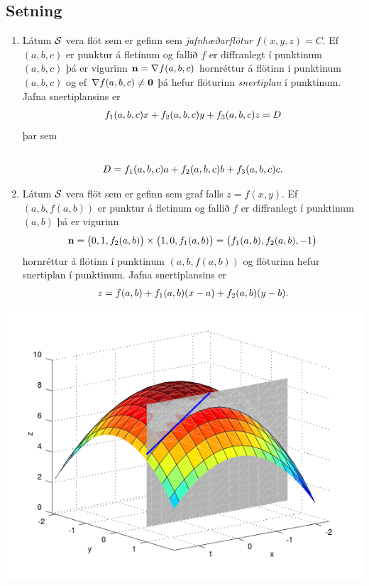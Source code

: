 \documentclass[a4paper,10pt,icelandic]{sphinxmanual}
\begin{document}
\subsection{Setning}
\label{Kafli5:id17}\begin{enumerate}
\item {} 
Látum \(\cal S\) vera flöt sem er gefinn sem \textit{jafnhæðarflötur}
\(f(x,y,z)=C\). Ef \((a, b, c)\) er punktur á fletinum og
fallið \(f\) er diffranlegt í punktinum \((a, b,c)\) þá er
vigurinn \(\mbox{${\bf n}$}=\nabla f(a, b, c)\) hornréttur á
flötinn í punktinum \((a,b, c)\) og ef
\(\nabla f(a, b, c)\neq \mbox{${\bf 0}$}\) þá hefur flöturinn
\textit{snertiplan} í punktinum. Jafna snertiplansins er
\begin{gather}
\begin{split}\displaystyle f_1(a, b, c)x+f_2(a, b, c)y+f_3(a, b, c)z=D\end{split}\notag
\end{gather}
þar sem
\begin{gather}
\begin{split}\displaystyle\end{split}\notag\\\begin{split}D= f_1(a, b, c)a+f_2(a, b, c)b
+f_3(a, b, c)c.\end{split}\notag
\end{gather}
\item {} 
Látum \(\cal S\) vera flöt sem er gefinn sem graf falls
\(z=f(x,y)\). Ef \((a, b, f(a,b))\) er punktur á fletinum og
fallið \(f\) er diffranlegt í punktinum \((a, b)\) þá er
vigurinn
\begin{gather}
\begin{split}\displaystyle \mbox{${\bf n}$}=\big(0 ,1 ,f_2(a, b)\big)\times\big(1 ,0 ,f_1(a, b)\big)=\big(f_1(a, b), f_2(a, b), -1\big)\end{split}\notag
\end{gather}
hornréttur á flötinn í punktinum \((a,b, f(a,b))\) og flöturinn
hefur snertiplan í punktinum. Jafna snertiplansins er
\begin{gather}
\begin{split}\displaystyle z=f(a, b)+f_1(a, b)(x-a)+f_2(a, b)(y-b).\end{split}\notag
\end{gather}
\end{enumerate}

{\hfill\includegraphics[width=0.700\linewidth]{xpart.png}\hfill}
\end{document}
